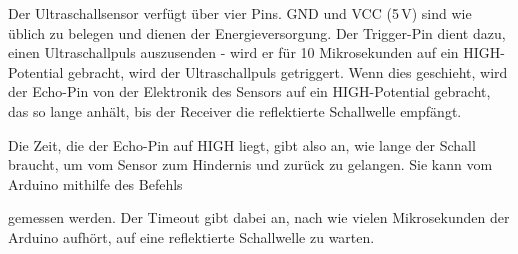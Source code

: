 Der Ultraschallsensor verfügt über vier Pins. GND und VCC (5\,V) sind wie üblich zu belegen und dienen der Energieversorgung. Der Trigger-Pin dient dazu, einen Ultraschallpuls auszusenden - wird er für 10 Mikrosekunden auf ein HIGH-Potential gebracht, wird der Ultraschallpuls getriggert. Wenn dies geschieht, wird der Echo-Pin von der Elektronik des Sensors auf ein HIGH-Potential gebracht, das so lange anhält, bis der Receiver die reflektierte Schallwelle empfängt. 

Die Zeit, die der Echo-Pin auf HIGH liegt, gibt also an, wie lange der Schall braucht, um vom Sensor zum Hindernis und zurück zu gelangen. Sie kann vom Arduino mithilfe des Befehls 

 gemessen werden. Der Timeout gibt dabei an, nach wie vielen Mikrosekunden der Arduino aufhört, auf eine reflektierte Schallwelle zu warten.

